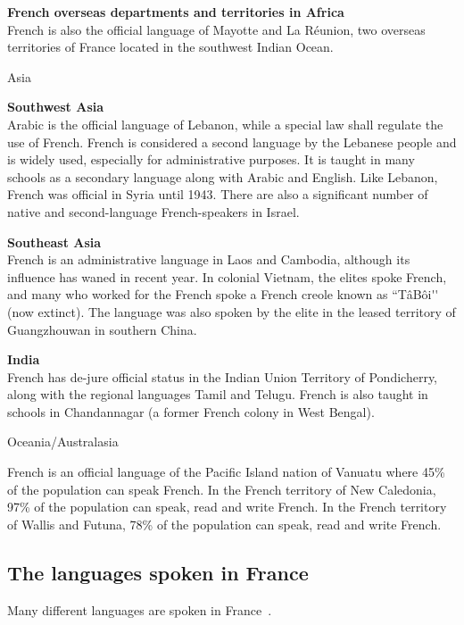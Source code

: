 \begin{multicols}{2}
{\bf French overseas departments and territories in Africa}\\
French is also the official language of Mayotte and La Réunion, two
overseas territories of France located in the southwest Indian Ocean.

\begin{center}
{\sc Asia}
\end{center}

{\bf Southwest Asia}\\ 
Arabic is the official language of Lebanon, while a special law shall
regulate the use of French. French is considered a second language by
the Lebanese people and is widely used, especially for administrative
purposes. It is taught in many schools as a secondary language along
with Arabic and English. Like Lebanon, French was official in Syria
until 1943. There are also a significant number of native and
second-language French-speakers in Israel.

{\bf Southeast Asia }\\
French is an administrative language in Laos and Cambodia, although
its influence has waned in recent year. In colonial Vietnam, the
elites spoke French, and many who worked for the French spoke a French
creole known as ``TâBôi{\mbox '}{\mbox '} (now extinct). The language was also spoken
by the elite in the leased territory of Guangzhouwan in southern
China.

{\bf India}\\
French has de-jure official status in the Indian Union Territory of
Pondicherry, along with the regional languages Tamil and
Telugu. French is also taught in schools in Chandannagar (a former
French colony in West Bengal).

\begin{center}
{\sc Oceania/Australasia}
\end{center}
French is an official language of the Pacific Island nation of Vanuatu
where 45\% of the population can speak French. In the French territory
of New Caledonia, 97\% of the population can speak, read and write
French. In the French territory of Wallis and Futuna, 78\% of the
population can speak, read and write French.

\subsection{The languages spoken in France}
\label{languageSpokenInTheFranceEn}
Many different languages are spoken in France~\cite{languesparleesfrance}.


\end{multicols}
